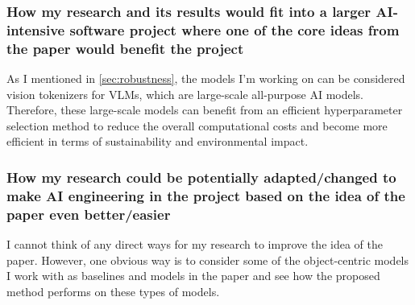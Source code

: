 \documentclass[11pt]{article}
\begin{document}
\subsubsection{How my research and its results would fit into a larger AI-intensive software project where one of the core ideas from the paper would benefit the project}
As I mentioned in \cref{sec:robustness}, the models I'm working on can be considered vision tokenizers for VLMs, which are large-scale all-purpose AI models. Therefore, these large-scale models can benefit from an efficient hyperparameter selection method to reduce the overall computational costs and become more efficient in terms of sustainability and environmental impact.


\subsubsection{How my research could be potentially adapted/changed to make AI engineering in the project based on the idea of the paper even better/easier}
I cannot think of any direct ways for my research to improve the idea of the paper. However, one obvious way is to consider some of the object-centric models I work with as baselines and models in the paper and see how the proposed method performs on these types of models.



\end{document}

